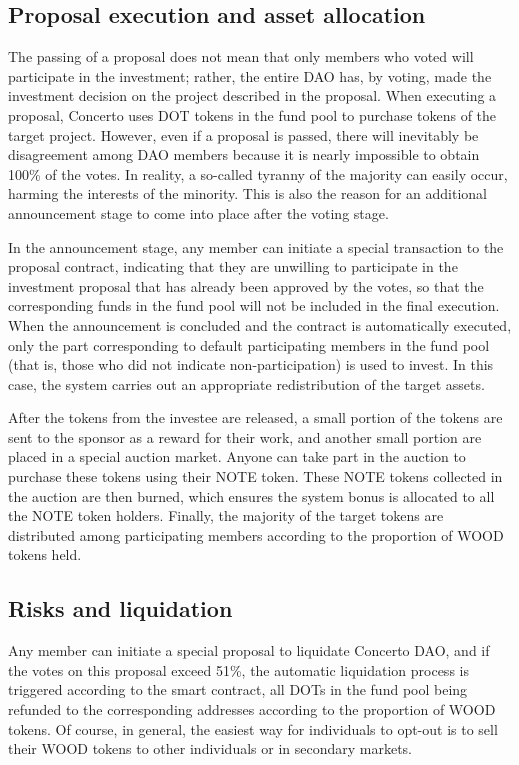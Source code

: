 \documentclass[UTF8]{article}
\begin{document}
\begin{multicols}{2}
\subsection{Proposal execution and asset allocation}

The passing of a proposal does not mean that only members who voted will participate in the investment; rather, the entire DAO has, by voting, made the investment decision on the project described in the proposal. When executing a proposal, Concerto uses DOT tokens in the fund pool to purchase tokens of the target project. However, even if a proposal is passed, there will inevitably be disagreement among DAO members because it is nearly impossible to obtain 100\% of the votes. In reality, a so-called tyranny of the majority can easily occur, harming the interests of the minority. This is also the reason for an additional announcement stage to come into place after the voting stage.

In the announcement stage, any member can initiate a special transaction to the proposal contract, indicating that they are unwilling to participate in the investment proposal that has already been approved by the votes, so that the corresponding funds in the fund pool will not be included in the final execution. When the announcement is concluded and the contract is automatically executed, only the part corresponding to default participating members in the fund pool (that is, those who did not indicate non-participation) is used to invest. In this case, the system carries out an appropriate redistribution of the target assets.

After the tokens from the investee are released, a small portion of the tokens are sent to the sponsor as a reward for their work, and another small portion are placed in a special auction market. Anyone can take part in the auction to purchase these tokens using their NOTE token. These NOTE tokens collected in the auction are then burned, which ensures the system bonus is allocated to all the NOTE token holders. Finally, the majority of the target tokens are distributed among participating members according to the proportion of WOOD tokens held.

\subsection{Risks and liquidation}

Any member can initiate a special proposal to liquidate Concerto DAO, and if the votes on this proposal exceed 51\%, the automatic liquidation process is triggered according to the smart contract, all DOTs in the fund pool being refunded to the corresponding addresses according to the proportion of WOOD tokens. Of course, in general, the easiest way for individuals to opt-out is to sell their WOOD tokens to other individuals or in secondary markets.


\end{multicols}
\end{document}

